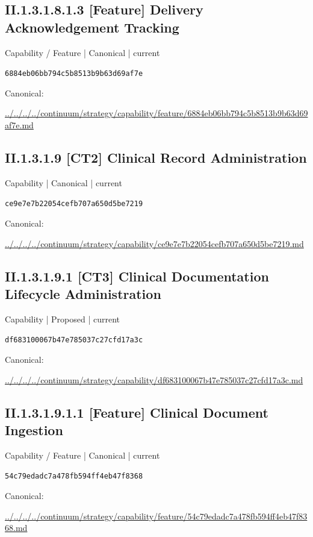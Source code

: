 \documentclass[10pt,a4paper]{article}
\begin{document}
\subsection*{II.1.3.1.8.1.3 [Feature] Delivery Acknowledgement Tracking}
{\small Capability / Feature | Canonical | current}\par
\texttt{6884eb06bb794c5b8513b9b63d69af7e}\par
Canonical: \par
{\footnotesize\url{../../../../continuum/strategy/capability/feature/6884eb06bb794c5b8513b9b63d69af7e.md}}\par
\subsection*{II.1.3.1.9 [CT2] Clinical Record Administration}
{\small Capability | Canonical | current}\par
\texttt{ce9e7e7b22054cefb707a650d5be7219}\par
Canonical: \par
{\footnotesize\url{../../../../continuum/strategy/capability/ce9e7e7b22054cefb707a650d5be7219.md}}\par
\subsection*{II.1.3.1.9.1 [CT3] Clinical Documentation Lifecycle Administration}
{\small Capability | Proposed | current}\par
\texttt{df683100067b47e785037c27cfd17a3c}\par
Canonical: \par
{\footnotesize\url{../../../../continuum/strategy/capability/df683100067b47e785037c27cfd17a3c.md}}\par
\subsection*{II.1.3.1.9.1.1 [Feature] Clinical Document Ingestion}
{\small Capability / Feature | Canonical | current}\par
\texttt{54c79edadc7a478fb594ff4eb47f8368}\par
Canonical: \par
{\footnotesize\url{../../../../continuum/strategy/capability/feature/54c79edadc7a478fb594ff4eb47f8368.md}}\par
\end{document}
